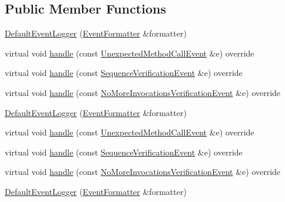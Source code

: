 \subsection*{Public Member Functions}
\begin{DoxyCompactItemize}
\item 
\mbox{\hyperlink{structfakeit_1_1DefaultEventLogger_a20fe9266e4a323b5fc282d797fe7ecfd}{Default\+Event\+Logger}} (\mbox{\hyperlink{structfakeit_1_1EventFormatter}{Event\+Formatter}} \&formatter)
\item 
virtual void \mbox{\hyperlink{structfakeit_1_1DefaultEventLogger_a4bbb520dfe6bf042d7f0380e7b400bce}{handle}} (const \mbox{\hyperlink{structfakeit_1_1UnexpectedMethodCallEvent}{Unexpected\+Method\+Call\+Event}} \&e) override
\item 
virtual void \mbox{\hyperlink{structfakeit_1_1DefaultEventLogger_a730fe776b90249dd62d750a7d6171f90}{handle}} (const \mbox{\hyperlink{structfakeit_1_1SequenceVerificationEvent}{Sequence\+Verification\+Event}} \&e) override
\item 
virtual void \mbox{\hyperlink{structfakeit_1_1DefaultEventLogger_ac2df9faf9057e440c0aa314f54ce6f1c}{handle}} (const \mbox{\hyperlink{structfakeit_1_1NoMoreInvocationsVerificationEvent}{No\+More\+Invocations\+Verification\+Event}} \&e) override
\item 
\mbox{\hyperlink{structfakeit_1_1DefaultEventLogger_a20fe9266e4a323b5fc282d797fe7ecfd}{Default\+Event\+Logger}} (\mbox{\hyperlink{structfakeit_1_1EventFormatter}{Event\+Formatter}} \&formatter)
\item 
virtual void \mbox{\hyperlink{structfakeit_1_1DefaultEventLogger_a4bbb520dfe6bf042d7f0380e7b400bce}{handle}} (const \mbox{\hyperlink{structfakeit_1_1UnexpectedMethodCallEvent}{Unexpected\+Method\+Call\+Event}} \&e) override
\item 
virtual void \mbox{\hyperlink{structfakeit_1_1DefaultEventLogger_a730fe776b90249dd62d750a7d6171f90}{handle}} (const \mbox{\hyperlink{structfakeit_1_1SequenceVerificationEvent}{Sequence\+Verification\+Event}} \&e) override
\item 
virtual void \mbox{\hyperlink{structfakeit_1_1DefaultEventLogger_ac2df9faf9057e440c0aa314f54ce6f1c}{handle}} (const \mbox{\hyperlink{structfakeit_1_1NoMoreInvocationsVerificationEvent}{No\+More\+Invocations\+Verification\+Event}} \&e) override
\item 
\mbox{\hyperlink{structfakeit_1_1DefaultEventLogger_a20fe9266e4a323b5fc282d797fe7ecfd}{Default\+Event\+Logger}} (\mbox{\hyperlink{structfakeit_1_1EventFormatter}{Event\+Formatter}} \&formatter)

\end{DoxyCompactItemize}
